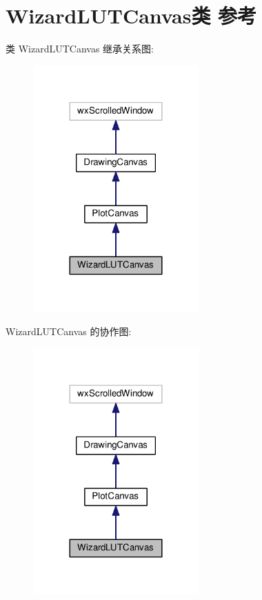 \hypertarget{class_wizard_l_u_t_canvas}{\section{Wizard\+L\+U\+T\+Canvas类 参考}
\label{class_wizard_l_u_t_canvas}
}


类 Wizard\+L\+U\+T\+Canvas 继承关系图\+:
\nopagebreak
\begin{figure}[H]
\begin{center}
\leavevmode
\includegraphics[width=180pt]{class_wizard_l_u_t_canvas__inherit__graph}
\end{center}
\end{figure}


Wizard\+L\+U\+T\+Canvas 的协作图\+:
\nopagebreak
\begin{figure}[H]
\begin{center}
\leavevmode
\includegraphics[width=180pt]{class_wizard_l_u_t_canvas__coll__graph}
\end{center}
\end{figure}
